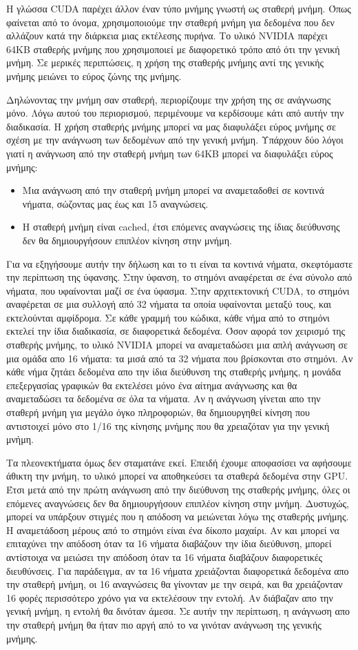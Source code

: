 Η γλώσσα CUDA παρέχει άλλον έναν τύπο μνήμης γνωστή ως σταθερή μνήμη. Όπως φαίνεται από το όνομα, χρησιμοποιούμε την σταθερή μνήμη για δεδομένα που δεν αλλάζουν κατά την διάρκεια μιας εκτέλεσης πυρήνα. Το υλικό NVIDIA παρέχει 64KB σταθερής μνήμης που χρησιμοποιεί με διαφορετικό τρόπο από ότι την γενική μνήμη. Σε μερικές περιπτώσεις, η χρήση της σταθερής μνήμης αντί της γενικής μνήμης μειώνει το εύρος ζώνης της μνήμης. 

Δηλώνοντας την μνήμη σαν σταθερή, περιορίζουμε την χρήση της σε ανάγνωσης μόνο. Λόγω αυτού του περιορισμού, περιμένουμε να κερδίσουμε κάτι από αυτήν την διαδικασία. Η χρήση σταθερής μνήμης μπορεί να μας διαφυλάξει εύρος μνήμης σε σχέση με την ανάγνωση των δεδομένων από την γενική μνήμη. Υπάρχουν δύο λόγοι γιατί η ανάγνωση από την σταθερή μνήμη των 64KB μπορεί να διαφυλάξει εύρος μνήμης:
\begin{itemize}
\item Μια ανάγνωση από την σταθερή μνήμη μπορεί να αναμεταδοθεί σε κοντινά νήματα, σώζοντας μας έως και 15 αναγνώσεις.
\item Η σταθερή μνήμη είναι cached, έτσι επόμενες αναγνώσεις της ίδιας διεύθυνσης δεν θα δημιουργήσουν επιπλέον κίνηση στην μνήμη.
\end{itemize}
Για να εξηγήσουμε αυτήν την δήλωση και το τι είναι τα κοντινά νήματα, σκεφτόμαστε την περίπτωση της ύφανσης. Στην ύφανση, το στημόνι αναφέρεται σε ένα σύνολο από νήματα, που υφαίνονται μαζί σε ένα ύφασμα. Στην αρχιτεκτονική CUDA, το στημόνι αναφέρεται σε μια συλλογή από 32 νήματα τα οποία υφαίνονται μεταξύ τους, και εκτελούνται αμφίδρομα. Σε κάθε γραμμή του κώδικα, κάθε νήμα από το στημόνι εκτελεί την ίδια διαδικασία, σε διαφορετικά δεδομένα.
Όσον αφορά τον χειρισμό της σταθερής μνήμης, το υλικό NVIDIA μπορεί να αναμεταδώσει μια απλή ανάγνωση σε μια ομάδα απο 16 νήματα: τα μισά από τα 32 νήματα που βρίσκονται στο στημόνι. Αν κάθε νήμα ζητάει δεδομένα απο την ίδια διεύθυνση της σταθερής μνήμης, η μονάδα επεξεργασίας γραφικών θα εκτελέσει μόνο ένα αίτημα ανάγνωσης και θα αναμεταδώσει τα δεδομένα σε όλα τα νήματα. Αν η ανάγνωση γίνεται απο την σταθερή μνήμη για μεγάλο όγκο πληροφοριών, θα δημιουργηθεί κίνηση που αντιστοιχεί μόνο στο 1/16 της κίνησης μνήμης που θα χρειαζόταν για την γενική μνήμη.

Τα πλεονεκτήματα όμως δεν σταματάνε εκεί. Επειδή έχουμε αποφασίσει να αφήσουμε άθικτη την μνήμη, το υλικό μπορεί να αποθηκεύσει τα σταθερά δεδομένα στην GPU. Έτσι μετά από την πρώτη ανάγνωση από την διεύθυνση της σταθερής μνήμης, όλες οι επόμενες αναγνώσεις δεν θα δημιουργήσουν επιπλέον κίνηση στην μνήμη. Δυστυχώς, μπορεί να υπάρξουν στιγμές που η απόδοση να μειώνεται λόγω της σταθερής μνήμης. Η αναμετάδοση μέρους από το στημόνι είναι ένα δίκοπο μαχαίρι. Αν και μπορεί να επιταχύνει την απόδοση όταν τα 16 νήματα διαβάζουν την ίδια διεύθυνση, μπορεί αντίστοιχα να μειώσει την απόδοση όταν τα 16 νήματα διαβάζουν διαφορετικές διευθύνσεις. Για παράδειγμα, αν τα 16 νήματα χρειάζονται διαφορετικά δεδομένα απο την σταθερή μνήμη, οι 16 αναγνώσεις θα γίνονταν με την σειρά, και θα χρειάζονταν 16 φορές περισσότερο χρόνο για να εκτελέσουν την εντολή. Αν διάβαζαν απο την γενική μνήμη, η εντολή θα δινόταν άμεσα. Σε αυτήν την περίπτωση, η ανάγνωση απο την σταθερή μνήμη θα ήταν πιο αργή από το να γινόταν ανάγνωση της γενικής μνήμης.
 
